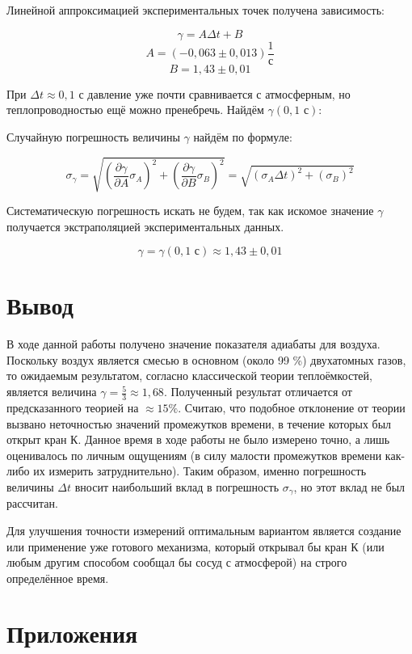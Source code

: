 \documentclass[15pt,a5paper,reqno]{article}
\begin{document}
    Линейной аппроксимацией экспериментальных точек получена зависимость:
    
        \[\gamma = A\Delta t + B\]
        \[A = (-0,063 \pm 0,013) \frac{1}{\text{с}}\]
        \[B = 1,43 \pm 0,01\]
        
    При $\Delta t \approx 0,1\text{ с}$ давление уже почти сравнивается с атмосферным, но теплопроводностью ещё можно пренебречь. Найдём $\gamma (0,1\text{ с})$:
    
    Случайную погрешность величины $\gamma$ найдём по формуле:
    
    \[\sigma_\gamma = \sqrt{\left(\frac{\partial\gamma}{\partial A} \sigma_A\right)^2 + \left(\frac{\partial\gamma}{\partial B} \sigma_B\right)^2} = \sqrt{\left(\sigma_A \Delta t\right)^2 + \left(\sigma_B\right)^2}\]
    
    Систематическую погрешность искать не будем, так как искомое значение $\gamma$ получается экстраполяцией экспериментальных данных.
    
    \[\gamma = \gamma(0,1\text{ с}) \approx 1,43 \pm 0,01\]
    
\section{Вывод}

    В ходе данной работы получено значение показателя адиабаты для воздуха. Поскольку воздух является смесью в основном (около 99 \%) двухатомных газов, то ожидаемым результатом, согласно классической теории теплоёмкостей, является величина $\gamma = \frac{5}{3} \approx 1,68$. Полученный результат отличается от предсказанного теорией на $\approx 15\%$. Считаю, что подобное отклонение от теории вызвано неточностью значений промежутков времени, в течение которых был открыт кран К. Данное время в ходе работы не было измерено точно, а лишь оценивалось по личным ощущениям (в силу малости промежутков времени как-либо их измерить затруднительно). Таким образом, именно погрешность величины $\Delta t$ вносит наибольший вклад в погрешность $\sigma_\gamma$, но этот вклад не был рассчитан.
    
    Для улучшения точности измерений оптимальным вариантом является создание или применение уже готового механизма, который открывал бы кран К (или любым другим способом сообщал бы сосуд с атмосферой) на строго определённое время.
    
\section{Приложения}
\end{document}
